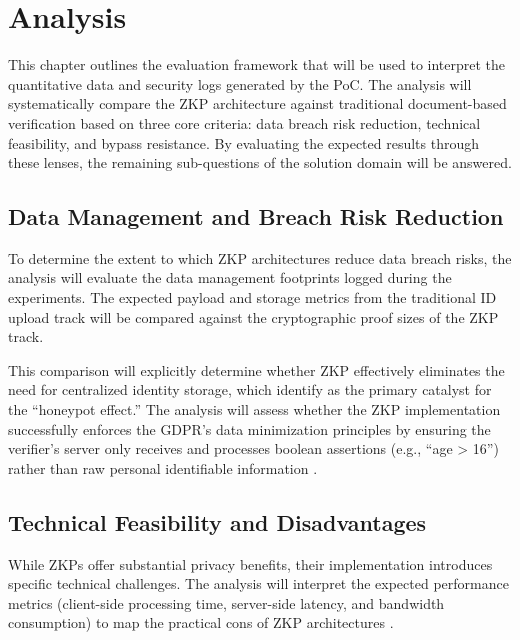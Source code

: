\documentclass [english]{hogent-article}
\begin{document}
    \section{Analysis}%
    
    \label{sec:analysis}
    
    This chapter outlines the evaluation framework that will be used to interpret the quantitative data and security logs generated by the PoC. The analysis will systematically compare the ZKP architecture against traditional document-based verification based on three core criteria: data breach risk reduction, technical feasibility, and bypass resistance. By evaluating the expected results through these lenses, the remaining sub-questions of the solution domain will be answered.
    
    
    
    \subsection{Data Management and Breach Risk Reduction}
    
    To determine the extent to which ZKP architectures reduce data breach risks, the analysis will evaluate the data management footprints logged during the experiments. The expected payload and storage metrics from the traditional ID upload track will be compared against the cryptographic proof sizes of the ZKP track. 
    
    
    
    This comparison will explicitly determine whether ZKP effectively eliminates the need for centralized identity storage, which \textcite{Bootsma2025} identify as the primary catalyst for the ``honeypot effect.'' The analysis will assess whether the ZKP implementation successfully enforces the GDPR's data minimization principles by ensuring the verifier's server only receives and processes boolean assertions (e.g., ``age > 16'') rather than raw personal identifiable information \autocite{Wodo2025}. 
 
    \subsection{Technical Feasibility and Disadvantages}
    
    While ZKPs offer substantial privacy benefits, their implementation introduces specific technical challenges. The analysis will interpret the expected performance metrics (client-side processing time, server-side latency, and bandwidth consumption) to map the practical cons of ZKP architectures \autocite{Lueks2026}. 
  
\end{document}
